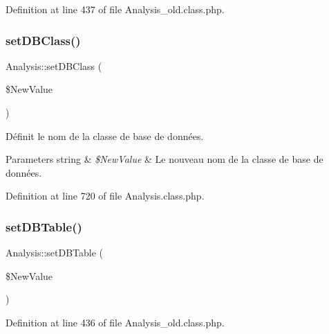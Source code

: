 Definition at line 437 of file Analysis\+\_\+old.\+class.\+php.

\mbox{\label{class_analysis_aabddf37a4240bafefd66b2bbff1b3058}} 
\subsubsection{\texorpdfstring{set\+D\+B\+Class()}{setDBClass()}\hspace{0.1cm}{\footnotesize\ttfamily [2/2]}}
{\footnotesize\ttfamily Analysis\+::set\+D\+B\+Class (\begin{DoxyParamCaption}\item[{}]{\$\+New\+Value }\end{DoxyParamCaption})}

Définit le nom de la classe de base de données.


\begin{DoxyParams}[1]{Parameters}
string & {\em \$\+New\+Value} & Le nouveau nom de la classe de base de données. \\
\hline
\end{DoxyParams}


Definition at line 720 of file Analysis.\+class.\+php.

\mbox{\label{class_analysis_a3d36fa472e9426224299a2b2fd03bc48}} 
\subsubsection{\texorpdfstring{set\+D\+B\+Table()}{setDBTable()}\hspace{0.1cm}{\footnotesize\ttfamily [1/2]}}
{\footnotesize\ttfamily Analysis\+::set\+D\+B\+Table (\begin{DoxyParamCaption}\item[{}]{\$\+New\+Value }\end{DoxyParamCaption})}



Definition at line 436 of file Analysis\+\_\+old.\+class.\+php.

\mbox{\label{class_analysis_a3d36fa472e9426224299a2b2fd03bc48}} 
